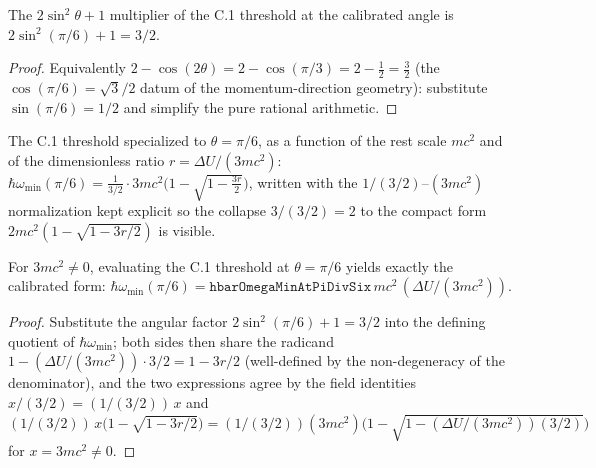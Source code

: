 \begin{lemma}[Angular factor at $\theta = \pi/6$]
\label{lem:IPhO2026Problems_problem_IPhO_2026_1_C_2:angular_factor_at_pi_div_six}
The $2\sin^2\theta + 1$ multiplier of the C.1 threshold at the calibrated
angle is $2\sin^2(\pi/6) + 1 = 3/2$.
\end{lemma}
\begin{proof}
Equivalently $2 - \cos(2\theta) = 2 - \cos(\pi/3) = 2 - \tfrac12 = \tfrac32$
(the $\cos(\pi/6) = \sqrt{3}/2$ datum of the momentum-direction geometry):
substitute $\sin(\pi/6) = 1/2$ and simplify the pure rational arithmetic.
\end{proof}

\begin{definition}[Threshold at $\theta = \pi/6$ in calibrated form]
\label{def:IPhO2026Problems_problem_IPhO_2026_1_C_2:hbarOmegaMinAtPiDivSix}
The C.1 threshold specialized to $\theta = \pi/6$, as a function of the rest
scale $mc^2$ and of the dimensionless ratio $r = \Delta U/(3 m c^2)$:
$\hbar\omega_{\min}(\pi/6) = \tfrac{1}{3/2}\cdot 3 m c^2
\bigl(1 - \sqrt{1 - \tfrac{3 r}{2}}\bigr)$, written with the
$1/(3/2)$--$(3 m c^2)$ normalization kept explicit so the collapse
$3/(3/2) = 2$ to the compact form $2 m c^2(1 - \sqrt{1 - 3r/2})$ is visible.
\end{definition}

\begin{theorem}
\label{thm:IPhO2026Problems_problem_IPhO_2026_1_C_2:hbarOmegaMin_at_pi_div_six}
For $3 m c^2 \ne 0$, evaluating the C.1 threshold at $\theta = \pi/6$ yields
exactly the calibrated form:
$\hbar\omega_{\min}(\pi/6) = \texttt{hbarOmegaMinAtPiDivSix}\,mc^2\,
(\Delta U/(3 m c^2))$.
\end{theorem}
\begin{proof}
Substitute the angular factor $2\sin^2(\pi/6) + 1 = 3/2$ into the defining
quotient of $\hbar\omega_{\min}$; both sides then share the radicand
$1 - (\Delta U/(3mc^2))\cdot 3/2 = 1 - 3r/2$ (well-defined by the
non-degeneracy of the denominator), and the two expressions agree by the
field identities $x/(3/2) = (1/(3/2))\,x$ and
$(1/(3/2))\,x\bigl(1-\sqrt{1-3r/2}\bigr)
= (1/(3/2))(3mc^2)\bigl(1-\sqrt{1-(\Delta U/(3mc^2))(3/2)}\bigr)$ for
$x = 3mc^2 \ne 0$.
\end{proof}

